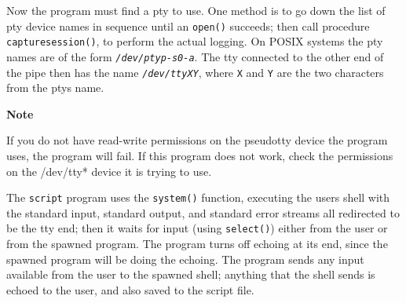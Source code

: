 Now the program must find a pty to use. One method is to go
down the list of pty device names in sequence until an
\texttt{open()} succeeds; then call procedure \texttt{capturesession()},
to perform the actual logging. On POSIX systems the pty
names are of the form \texttt{\textit{/dev/ptyp-s0-a}}. The tty
connected to the other end of the pipe then has the name
\texttt{\textit{/dev/ttyXY}}, where \texttt{X} and \texttt{Y} are the
two characters from the pty{\textquotesingle}s name.



{\sffamily\bfseries
Note}

{\sffamily
If you do not have read-write permissions on the pseudotty device the
program uses, the program will fail. If this program does not work,
check the permissions on the /dev/tty* device it is trying to use. }

The \texttt{script} program uses the \texttt{system()}
function, executing the user{\textquotesingle}s shell with the standard
input, standard output, and standard error streams all redirected to be
the tty end; then it waits for input (using
\texttt{select()}) either from the user or from the
spawned program. The program turns off echoing at its end, since the
spawned program will be doing the echoing. The program sends any input
available from the user to the spawned shell; anything that the shell
sends is echoed to the user, and also saved to the script file. 

